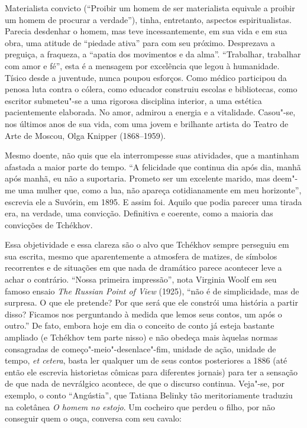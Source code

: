 Materialista convicto (``Proibir um homem de ser materialista
equivale a proibir um homem de procurar a verdade''), tinha,
entretanto, aspectos espiritualistas. Parecia desdenhar o homem,
mas teve incessantemente, em sua vida e em sua obra, uma atitude
de ``piedade ativa'' para com seu próximo. Desprezava a preguiça,
a fraqueza, a ``apatia dos movimentos e da alma''. ``Trabalhar,
trabalhar com amor e fé'', esta é a mensagem por excelência que
legou à humanidade. Tísico desde a juventude, nunca poupou esforços.
Como médico participou da penosa luta contra o cólera, como educador
construiu escolas e bibliotecas, como escritor submeteu"-se a uma
rigorosa disciplina interior, a uma estética pacientemente elaborada.
No amor, admirou a energia e a vitalidade. Casou"-se, nos últimos
anos de sua vida, com uma jovem e brilhante artista do Teatro de
Arte de Moscou, Olga Knipper (1868--1959).

Mesmo doente, não quis que ela interrompesse suas atividades, que
a mantinham afastada a maior parte do tempo. ``A felicidade que
continua dia após dia, manhã após manhã, eu não a suportaria.
Prometo ser um excelente marido, mas deem"-me uma mulher que,
como a lua, não apareça cotidianamente em meu horizonte'',
escrevia ele a Suvórin, em 1895. E assim foi. Aquilo que podia
parecer uma tirada era, na verdade, uma convicção. Definitiva e
coerente, como a maioria das convicções de Tchékhov.

Essa objetividade e essa clareza são o alvo que Tchékhov sempre
perseguiu em sua escrita, mesmo que aparentemente a atmosfera de
matizes, de símbolos recorrentes e de situações em que nada de
dramático parece acontecer leve a achar o contrário. ``Nossa
primeira impressão'', nota Virginia Woolf em seu famoso ensaio
\emph{The Russian Point of View} (1925), ``não é de simplicidade,
mas de surpresa. O que ele pretende? Por que será que ele constrói
uma história a partir disso? Ficamos nos perguntando à medida que
lemos seus contos, um após o outro.'' De fato, embora hoje em dia
o conceito de conto já esteja bastante ampliado (e
Tchékhov tem parte nisso) e não obedeça mais àquelas normas
consagradas de começo"-meio"-desenlace"-fim, unidade de ação,
unidade de tempo, \emph{et cetera}, basta ler qualquer um de
seus contos posteriores a 1886 (até então ele escrevia historietas
cômicas para diferentes jornais) para ter a sensação de que nada
de nevrálgico acontece, de que o discurso continua. Veja"-se, por
exemplo, o conto ``Angústia'', que Tatiana Belinky tão meritoriamente
traduziu na coletânea \emph{O homem no estojo}. Um cocheiro que
perdeu o filho, por não conseguir quem o ouça, conversa com seu
cavalo: 

